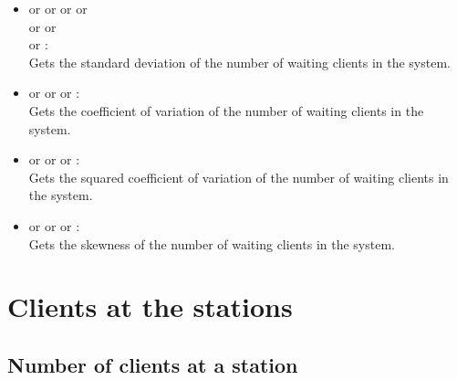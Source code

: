 \begin{itemize}
\item
{} or  or  or  or\\
 or  or\\
 or :\\
Gets the standard deviation of the number of waiting clients in the system.

\item
{} or  or  or :\\
Gets the coefficient of variation of the number of waiting clients in the system.

\item
{} or  or  or :\\
Gets the squared coefficient of variation of the number of waiting clients in the system.

\item
{} or  or  or :\\
Gets the skewness of the number of waiting clients in the system.

\end{itemize}





\section{Clients at the stations}



\subsection{Number of clients at a station}

